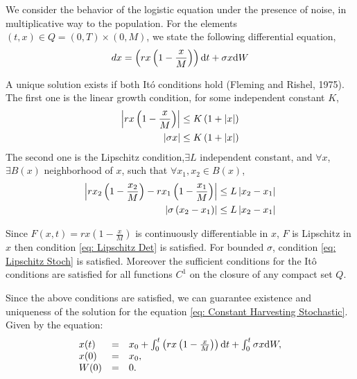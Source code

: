 We consider the behavior of the logistic equation under the presence of noise, in multiplicative way to the population. For the elements $(t,x)\in Q=(0, T)\times(0, M)$, we state the following differential equation,
\begin{equation}
	dx=\left(rx\left(1-\frac{x}{M}\right)\right)\mathrm{d} t+\sigma x\mathrm{d} W \label{eq: Constant Harvesting Stochastic}
\end{equation}

A unique solution exists if both It\'o conditions hold (Fleming and Rishel, 1975). The first one is the linear growth condition, for some independent constant $K$,
\begin{align}
	\left|rx\left(1-\frac{x}{M}\right)\right|&\leq K\left(1+\left|x\right|\right) \label{eq: LinearGrowth Det}\\
	\left|\sigma x\right|&\leq K\left(1+\left|x\right|\right) \label{eq: LinearGrowth Stoch}
\end{align}
The second one is the Lipschitz condition,$\exists L$ independent constant, and $\forall x$, $\exists B(x)$ neighborhood of $x$, such that $\forall x_1, x_2 \in B(x)$,
\begin{align}
\left|rx_2\left(1-\frac{x_2}{M}\right)-rx_1\left(1-\frac{x_1}{M}\right)\right|&\leq L \left|x_2-x_1\right| \label{eq: Lipschitz Det}\\
\left|\sigma\left(x_2-x_1\right)\right| &\leq L \left|x_2-x_1\right| \label{eq: Lipschitz Stoch}
\end{align}

Since $F(x,t)=rx\left(1-\frac{x}{M}\right)$ is continuously differentiable in $x$, $F$ is Lipschitz in $x$ then condition \ref{eq: Lipschitz Det} is satisfied. For bounded $\sigma$, condition \ref{eq: Lipschitz Stoch} is satisfied. Moreover the sufficient conditions for the It\^o conditions are satisfied for all functions $C^1$ on the closure of any compact set $Q$.

Since the above conditions are satisfied, we can guarantee existence and uniqueness of the solution for the equation \ref{eq: Constant Harvesting Stochastic}. Given by the equation:
\begin{equation}
\begin{array}{lll}
	x(t)&=&x_0+\int_{0}^{t}\left(rx\left(1-\frac{x}{M}\right)\right)\mathrm{d} t + \int_{0}^{t}\sigma x \mathrm{d} W,\\
	x(0)&=&x_0, \\
	W(0)&=&0.
\end{array}
\end{equation}


